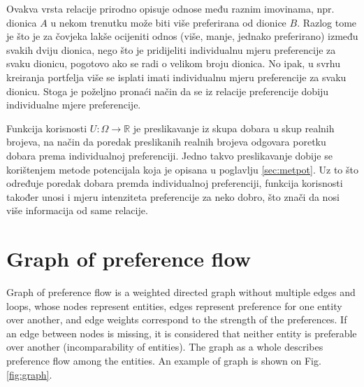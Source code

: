 \documentclass[lmodern, utf8, diplomski]{fer}
\begin{document}
  Ovakva vrsta relacije prirodno opisuje odnose među raznim imovinama, npr. dionica $A$ u nekom trenutku može biti više preferirana od dionice $B$.
  Razlog tome je što je za čovjeka lakše ocijeniti odnos (više, manje, jednako preferirano) između svakih dviju dionica, nego što je pridijeliti individualnu mjeru preferencije za svaku dionicu, pogotovo ako se radi o velikom broju dionica.
  No ipak, u svrhu kreiranja portfelja više se isplati imati individualnu mjeru preferencije za svaku dionicu.
  Stoga je poželjno pronaći način da se iz relacije preferencije dobiju individualne mjere preferencije.
  
  Funkcija korisnosti $U\colon \Omega \to \mathbb{R}$ je preslikavanje iz skupa dobara u skup realnih brojeva, na način da poredak preslikanih realnih brojeva odgovara poretku dobara prema individualnoj preferenciji.
  Jedno takvo preslikavanje dobije se korištenjem metode potencijala koja je opisana u poglavlju \ref{sec:metpot}.
  Uz to što određuje poredak dobara premda individualnoj preferenciji, funkcija korisnosti također unosi i mjeru intenziteta preferencije za neko dobro, što znači da nosi više informacija od same relacije.

  \section{Graph of preference flow}
  
  Graph of preference flow is a weighted directed graph without multiple edges and loops, whose nodes represent entities, edges represent preference for one entity over another, and edge weights correspond to the strength of the preferences.
  If an edge between nodes is missing, it is considered that neither entity is preferable over another (incomparability of entities).
  The graph as a whole describes preference flow among the entities.
  An example of graph is shown on Fig. \ref{fig:graph}.
  
\end{document}
